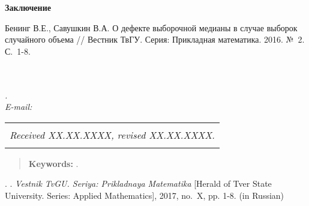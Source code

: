 \documentclass[a4paper,twoside]{article}
\newcommand{\header}[1]{\bigskip\medskip\noindent\textbf{#1}\nopagebreak\bigskip}
\theoremstyle{theorem}
\theoremstyle{remark}
\newcommand{\pages}{1-8}
\begin{document}


\header{Заключение}




\bigskip\bigskip{}
\begin{thebibliography}{99}
        
\end{thebibliography}

\bigskip{}\medskip
{Бенинг В.Е., Савушкин В.А. О дефекте выборочной медианы в случае выборок случайного объема // Вестник ТвГУ. Серия: Прикладная математика. 2016. №~2. С.~\pages.}

\bigskip{}


\newpage
\thispagestyle{plain}
\begin{center}
    {\bf }
\vspace{4mm}\par
    {\bf }\\
    \\
    {\it .\\ E-mail: }\\ \vspace{2mm}
\end{center}
\vspace{2mm}\par

\begin{center}
\renewcommand{\arraystretch}{0}
\begin{tabular}{c}
\hline
\rule{0pt}{2mm}\\
\small\it
Received XX.XX.XXXX,
revised XX.XX.XXXX.
\\
\rule{0pt}{2mm}\\
\hline
\end{tabular}
\end{center}

\begin{quote}
    
\end{quote}
\begin{quote}
    {\bf Keywords:} .
\end{quote}
\vspace{5mm}

\medskip
{. . {\it Vestnik TvGU. Seriya: Prikladnaya Matematika} [Herald of Tver State University. Series: Applied Mathematics], 2017, no.~X, pp. \pages.} (in Russian) 


\bigskip\bigskip{}

\end{document}
